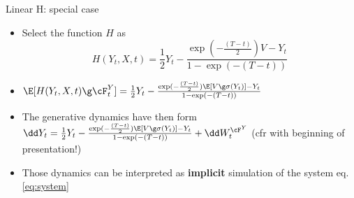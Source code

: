 \begin{frame}{Linear H: special case}
\begin{itemize}
    \item Select the function $H$ as
   \begin{equation}
       H(Y_t,X,t)=\frac{1}{2}Y_t -\frac{\exp(-\frac{(T-t)}{2})V-Y_t}{1-\exp(-(T-t))}
   \end{equation}
\item $\E[H(Y_t,X,t) \g \cF^Y_t]=\frac{1}{2}Y_t -\frac{\exp(-\frac{(T-t)}{2})\E[V \g \sigma(Y_t)]-Y_t}{1-\exp(-(T-t))}$
\item The generative dynamics have then form $\dd Y_t=\frac{1}{2}Y_t -\frac{\exp(-\frac{(T-t)}{2})\E[V \g \sigma(Y_t)]-Y_t}{1-\exp(-(T-t))}+\dd W^{\cF^Y}_t$ (cfr with beginning of presentation!)
\item Those dynamics can be interpreted as \textbf{implicit} simulation of the system eq.\ref{eq:system}
    \end{itemize}
\end{frame}


